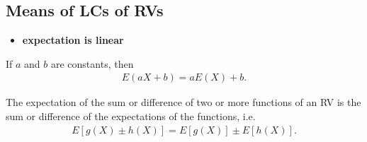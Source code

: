 \documentclass[10pt]{article}
\begin{document}
\subsection{Means of LCs of RVs}
\begin{itemize}
    \item \textbf{expectation is linear} 
\end{itemize}
\begin{theorem}
    If $a$ and $b$ are constants, then
    \begin{align*}
        E(aX+b) = aE(X)+b
    .\end{align*}
\end{theorem}
\begin{theorem}
    The expectation of the sum or difference of two or more functions of an RV is the sum or difference of the expectations of the functions, i.e.
    \begin{align*}
        E[g(X) \pm h(X)] = E[g(X)] \pm E[h(X)]
    .\end{align*}
\end{theorem}
\end{document}
